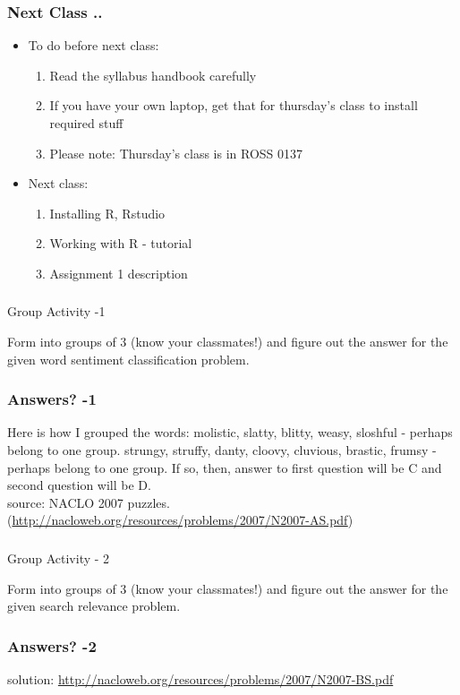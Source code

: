 \documentclass{beamer}
\begin{document}
\begin{frame}
\frametitle{Next Class ..} 
\begin{itemize}
\item To do before next class:
\begin{enumerate}
\item Read the syllabus handbook carefully
\item If you have your own laptop, get that for thursday's class to install required stuff
\item Please note: Thursday's class is in ROSS 0137
\end{enumerate}
\item Next class: 
\begin{enumerate}
\item Installing R, Rstudio 
\item Working with R - tutorial
\item Assignment 1 description
\end{enumerate} 
\end{itemize}
\end{frame}


\begin{frame}
\frametitle{}
\begin{center}
\Large Group Activity -1 
\end{center}
Form into groups of 3 (know your classmates!) and figure out the answer for the given word sentiment classification problem. 
\end{frame}

\begin{frame}
\frametitle{Answers? -1}
Here is how I grouped the words: molistic, slatty, blitty, weasy, sloshful - perhaps belong to one group.
strungy, struffy, danty, cloovy, cluvious, brastic, frumsy - perhaps belong to one group. If so, then, answer to first question will be C and second question will be D. 
\\ source: NACLO 2007 puzzles. (\url{http://nacloweb.org/resources/problems/2007/N2007-AS.pdf})
\end{frame}

\begin{frame}
\frametitle{}
\begin{center}
\Large Group Activity - 2
\end{center}
Form into groups of 3 (know your classmates!) and figure out the answer for the given search relevance problem. 
\end{frame}

\begin{frame}
\frametitle{Answers? -2}
solution: \url{http://nacloweb.org/resources/problems/2007/N2007-BS.pdf}
\end{frame}
\end{document}
